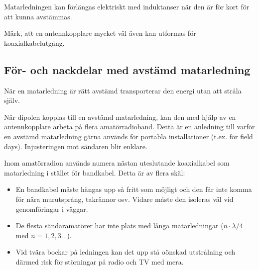 Matarledningen kan förlängas elektriskt med induktanser när den är för
kort för att kunna avstämmas.

Märk, att en antennkopplare mycket väl även kan utformas för
koaxialkabelutgång.

\subsection{För- och nackdelar med avstämd matarledning}

När en matarledning är rätt avstämd transporterar den energi utan att
stråla själv.

När dipolen kopplas till en avstämd matarledning, kan den med hjälp av
en antennkopplare arbeta på flera amatörradioband.
Detta är en anledning till varför en avstämd matarledning gärna används för
portabla installationer (t.ex. för field days).
Injusteringen mot sändaren blir enklare.

Inom amatörradion används numera nästan uteslutande koaxialkabel som
matarledning i stället för bandkabel.
Detta är av flera skäl:

\begin{itemize}
\item En bandkabel måste hängas upp så fritt som möjligt och den får
  inte komma för nära murutsprång, takrännor osv.
  Vidare måste den isoleras väl vid genomföringar i väggar.

\item De flesta sändaramatörer har inte plats med långa matarledningar
  (\(n\cdot\lambda/4\) med \(n = 1, 2, 3 \dots\)).

\item Vid tvära bockar på ledningen kan det upp stå oönskad
  utstrålning och därmed risk för störningar på radio och TV med mera.
\end{itemize}

